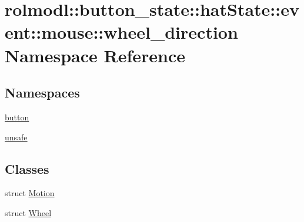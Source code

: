 \hypertarget{namespacerolmodl_1_1button__state_1_1hat_state_1_1event_1_1mouse_1_1wheel__direction}{}\section{rolmodl\+::button\+\_\+state\+::hat\+State\+::event\+::mouse\+::wheel\+\_\+direction Namespace Reference}
\label{namespacerolmodl_1_1button__state_1_1hat_state_1_1event_1_1mouse_1_1wheel__direction}
\subsection*{Namespaces}
\begin{DoxyCompactItemize}
\item 
 \mbox{\hyperlink{namespacerolmodl_1_1button__state_1_1hat_state_1_1event_1_1mouse_1_1wheel__direction_1_1button}{button}}
\item 
 \mbox{\hyperlink{namespacerolmodl_1_1button__state_1_1hat_state_1_1event_1_1mouse_1_1wheel__direction_1_1unsafe}{unsafe}}
\end{DoxyCompactItemize}
\subsection*{Classes}
\begin{DoxyCompactItemize}
\item 
struct \mbox{\hyperlink{structrolmodl_1_1button__state_1_1hat_state_1_1event_1_1mouse_1_1wheel__direction_1_1_motion}{Motion}}
\item 
struct \mbox{\hyperlink{structrolmodl_1_1button__state_1_1hat_state_1_1event_1_1mouse_1_1wheel__direction_1_1_wheel}{Wheel}}
\end{DoxyCompactItemize}
